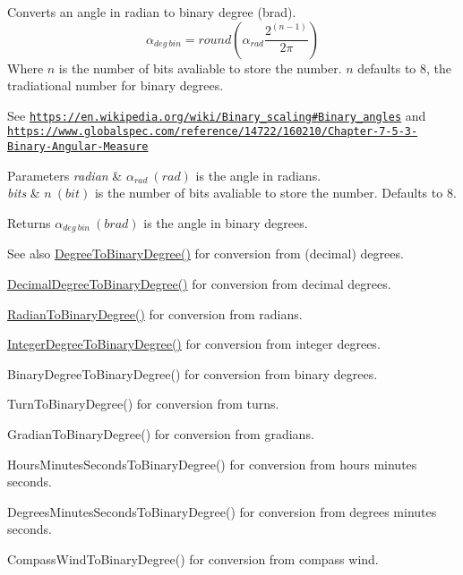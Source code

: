 Converts an angle in radian to binary degree (brad). \[\alpha_{deg\ bin}=round(\alpha_{rad}\frac{2^(n-1)}{2 \pi})\] Where $n$ is the number of bits avaliable to store the number. $n$ defaults to 8, the tradiational number for binary degrees. 

See \href{https://en.wikipedia.org/wiki/Binary_scaling#Binary_angles}{\tt https\+://en.\+wikipedia.\+org/wiki/\+Binary\+\_\+scaling\#\+Binary\+\_\+angles} and \href{https://www.globalspec.com/reference/14722/160210/Chapter-7-5-3-Binary-Angular-Measure}{\tt https\+://www.\+globalspec.\+com/reference/14722/160210/\+Chapter-\/7-\/5-\/3-\/\+Binary-\/\+Angular-\/\+Measure} 
\begin{DoxyParams}{Parameters}
{\em radian} & $\alpha_{rad}\ (rad)$ is the angle in radians. \\
\hline
{\em bits} & $n\ (bit)$ is the number of bits avaliable to store the number. Defaults to 8. \\
\hline
\end{DoxyParams}
\begin{DoxyReturn}{Returns}
$\alpha_{deg\ bin}\ (brad)$ is the angle in binary degrees. 
\end{DoxyReturn}
\begin{DoxySeeAlso}{See also}
\mbox{\hyperlink{group___e_g_x_math-_angle_conversions-_degree_gacd1e3dc5194e89426a899a7cac4874f8}{Degree\+To\+Binary\+Degree()}} for conversion from (decimal) degrees. 

\mbox{\hyperlink{group___e_g_x_math-_angle_conversions-_decimal_degree_gaceec7ae7988c7f342d0b0fa6940720a1}{Decimal\+Degree\+To\+Binary\+Degree()}} for conversion from decimal degrees. 

\mbox{\hyperlink{group___e_g_x_math-_angle_conversions-_radian_ga13311d9b6977d514f1d6c336e7c0162b}{Radian\+To\+Binary\+Degree()}} for conversion from radians. 

\mbox{\hyperlink{group___e_g_x_math-_angle_conversions-_integer_degree_ga694bbfe624c3c14e97ce6155ca9bc44d}{Integer\+Degree\+To\+Binary\+Degree()}} for conversion from integer degrees. 

Binary\+Degree\+To\+Binary\+Degree() for conversion from binary degrees. 

Turn\+To\+Binary\+Degree() for conversion from turns. 

Gradian\+To\+Binary\+Degree() for conversion from gradians. 

Hours\+Minutes\+Seconds\+To\+Binary\+Degree() for conversion from hours minutes seconds. 

Degrees\+Minutes\+Seconds\+To\+Binary\+Degree() for conversion from degrees minutes seconds. 

Compass\+Wind\+To\+Binary\+Degree() for conversion from compass wind. 
\end{DoxySeeAlso}
\mbox{\label{group___e_g_x_math-_angle_conversions-_radian_ga4d845b171148481aa7e85018d6dad035}} 
